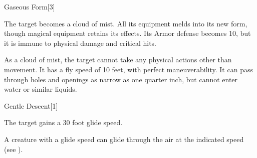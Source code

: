 \begin{spellsection}{Gaseous Form}[3]
    \begin{spellheader}
    \end{spellheader}
    \begin{spellcontent}
        \begin{spelltargetinginfo}
        \end{spelltargetinginfo}
        \begin{spelleffects}
            \spelleffect The target becomes a cloud of mist. All its equipment melds into its new form, though magical equipment retains its effects. Its Armor defense becomes 10, but it is immune to physical damage and critical hits.

            As a cloud of mist, the target cannot take any physical actions other than movement. It has a fly speed of 10 feet, with perfect maneuverability. It can pass through holes and openings as narrow as one quarter inch, but cannot enter water or similar liquids.
            \spelldur \durshort \dismissable
        \end{spelleffects}
    \end{spellcontent}
    \begin{spellfooter}
        \miscastexplode
    \end{spellfooter}
\end{spellsection}

\begin{spellsection}{Gentle Descent}[1]
    \begin{spellheader}
    \end{spellheader}
    \begin{spellcontent}
        \begin{spelltargetinginfo}
        \end{spelltargetinginfo}
        \begin{spelleffects}
            \spelleffect The target gains a 30 foot glide speed.
            \spelldur \durshort
        \end{spelleffects}
    \end{spellcontent}
    \begin{spellfooter}
        \spellnotes A creature with a glide speed can glide through the air at the indicated speed (see ).
        \miscastrandom
    \end{spellfooter}
\end{spellsection}

